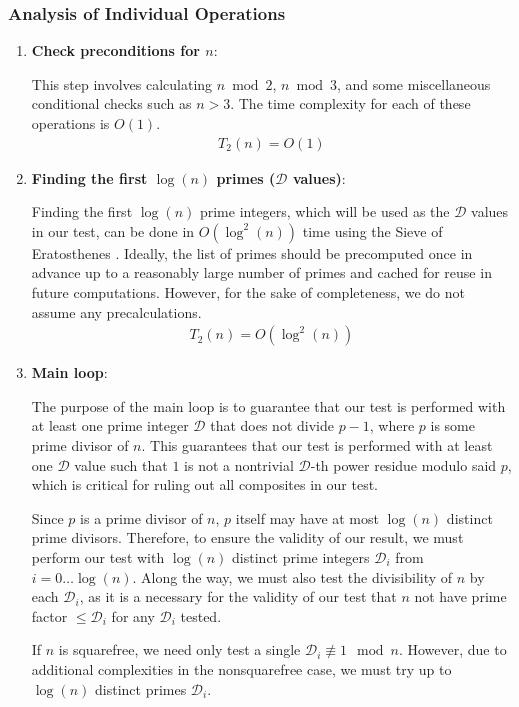 \documentclass{article}
\theoremstyle{plain}
\theoremstyle{definition}
\newcommand{\D}{\mathcal{D}}
\begin{document}
\subsubsection{Analysis of Individual Operations}
\begin{enumerate}[label*=\arabic*.]
    \item \textbf{Check preconditions for $n$}:
    
    This step involves calculating $n \bmod{2}$, $n \bmod{3}$, and some miscellaneous conditional checks such as $n > 3$. The time complexity for each of these operations is $O(1)$.
    \begin{align}
        T_2(n) = O(1)
    \end{align}
    
    \item \textbf{Finding the first $\log(n)$ primes ($\D$ values)}:
    
    Finding the first $\log(n)$ prime integers, which will be used as the $\D$ values in our test, can be done in $O(\log^2(n))$ time using the Sieve of Eratosthenes \cite{cormen2009algorithms}. Ideally, the list of primes should be precomputed once in advance up to a reasonably large number of primes and cached for reuse in future computations. However, for the sake of completeness, we do not assume any precalculations.
    \begin{align}
        T_2(n) = O(\log^2(n))
    \end{align}
        
    \item \textbf{Main loop}:
    
    The purpose of the main loop is to guarantee that our test is performed with at least one prime integer $\D$ that does not divide $p-1$, where $p$ is some prime divisor of $n$. This guarantees that our test is performed with at least one $\D$ value such that $1$ is not a nontrivial $\D$-th power residue modulo said $p$, which is critical for ruling out all composites in our test.
    
    Since $p$ is a prime divisor of $n$, $p$ itself may have at most $\log(n)$ distinct prime divisors. Therefore, to ensure the validity of our result, we must perform our test with $\log(n)$ distinct prime integers $\D_i$ from $i=0\ldots\log(n)$. Along the way, we must also test the divisibility of $n$ by each $\D_i$, as it is a necessary for the validity of our test that $n$ not have prime factor $\leq \D_i$ for any $\D_i$ tested.

    If $n$ is squarefree, we need only test a single $\D_i \not\equiv 1 \mod{n}$. However, due to additional complexities in the nonsquarefree case, we must try up to $\log(n)$ distinct primes $\D_i$.


\end{enumerate}
\end{document}
